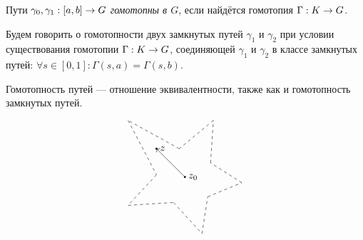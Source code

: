 \documentclass[a4paper]{report}
\begin{document}
    Пути $\gamma_0, \gamma_1: [a, b] \rightarrow G$ \emph{гомотопны в $G$}, если найдётся гомотопия $\Gamma: K \rightarrow G$.

    Будем говорить о гомотопности двух замкнутых путей $\gamma_1$ и $\gamma_2$ при условии существования гомотопии $\Gamma: K \rightarrow G$, соединяющей $\gamma_1$ и $\gamma_2$ в классе замкнутых путей: $\forall s \in [0, 1]: \Gamma(s, a) = \Gamma(s, b)$.

    Гомотопность путей --- отношение эквивалентности, также как и гомотопность замкнутых путей.

%
%
    \[\begin{tikzpicture}
          \draw[dashed] (0.9, 0.5) -- (1, 2);
          \draw[dashed] (1, 2) -- (-0.2, 1);
          \draw[dashed] (-0.2, 1) -- (-2, 2);
          \draw[dashed] (-2, 2) -- (-1, 0.08);
          \draw[dashed] (-1, 0.08) -- (-2, -1);
          \draw[dashed] (-2, -1) -- (-0.4, -0.9);
          \draw[dashed] (-0.4, -0.9) -- (0.6, -2);
          \draw[dashed] (0.6, -2) -- (0.8, -0.7);
          \draw[dashed] (0.8, -0.7) -- (2, -0.2);
          \draw[dashed] (2, -0.2) -- (0.9, 0.5);
          \fill (0, 0) circle (1pt) node[right] {$z_0$};
          \fill (-1, 1) circle (1pt) node[right] {$z$};
          \draw[->] (0, 0) -- (-1, 1);
    \end{tikzpicture}\]
\end{document}
